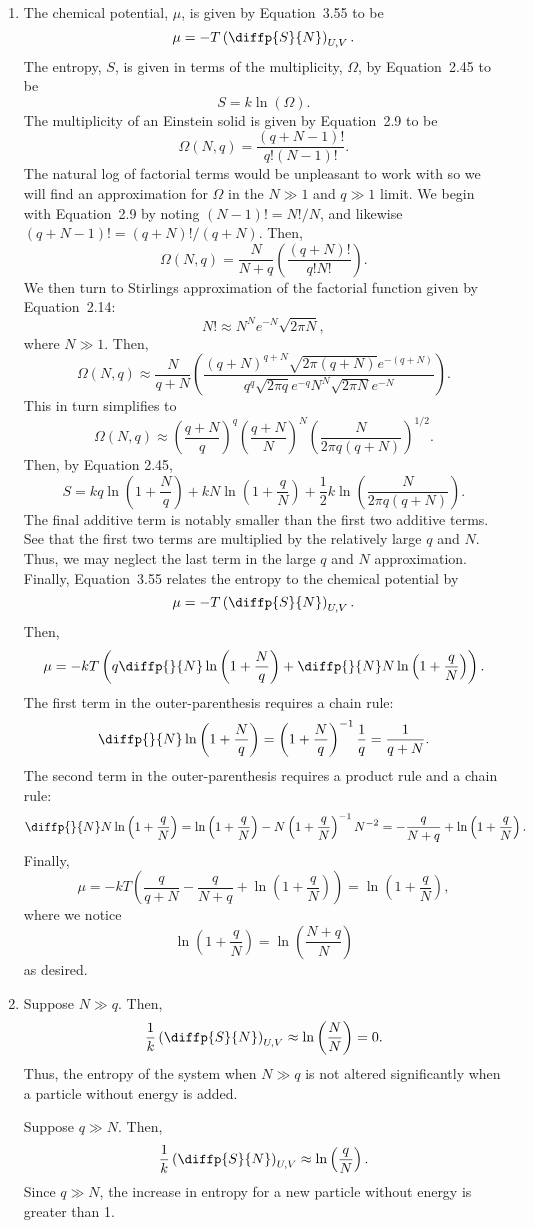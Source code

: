 \documentclass[a4paper, 12pt]{config/homework}
\begin{document}
\begin{enumerate}[label=\textbf{(\alph*)}]
\item The chemical potential, \(\mu\), is given by Equation~3.55 to be
\[\mu = -T\left(\diffp{S}{N}\right)_{U,V}.\]
The entropy, \(S\), is given in terms of the multiplicity, \(\Omega\), by Equation~2.45 to be
\[S = k\ln\left(\Omega\right).\]
The multiplicity of an Einstein solid is given by Equation~2.9 to be
\[\Omega(N,q) = \frac{(q+N-1)!}{q!(N-1)!}.\]
The natural log of factorial terms would be unpleasant to work with so we will find an approximation for \(\Omega\) in the \(N\gg 1\) and \(q\gg 1\) limit. We begin with Equation~2.9 by noting \((N-1)! = N!/N\), and likewise \((q+N-1)!=(q+N)!/(q+N)\). Then,
\[\Omega(N,q) = \frac{N}{N+q}\left(\frac{(q+N)!}{q!N!}\right).\]
We then turn to Stirlings approximation of the factorial function given by Equation~2.14:
\[N! \approx N^N e^{-N}\sqrt{2\pi N},\]
where \(N\gg 1\). Then,
\[\Omega(N,q) \approx \frac{N}{q+N}\left(\frac{(q+N)^{q+N}\sqrt{2\pi (q+N)}e^{-(q+N)}}{q^q \sqrt{2\pi q}e^{-q} N^N \sqrt{2\pi N} e^{-N}}\right).\]
This in turn simplifies to
\[\Omega(N,q) \approx \left(\frac{q+N}{q}\right)^q \left(\frac{q+N}{N}\right)^N \left(\frac{N}{2\pi q \left(q+N\right)}\right)^{1/2}.\]
Then, by Equation 2.45,
\[S = kq\ln\left(1 + \frac{N}{q}\right) + kN\ln\left(1 + \frac{q}{N}\right) + \frac{1}{2}k\ln\left(\frac{N}{2\pi q (q + N)}\right).\]
The final additive term is notably smaller than the first two additive terms. See that the first two terms are multiplied by the relatively large \(q\) and \(N\). Thus, we may neglect the last term in the large \(q\) and \(N\) approximation. Finally, Equation~3.55 relates the entropy to the chemical potential by
\[\mu = -T \left(\diffp{S}{N}\right)_{U,V}.\]
Then,
\[\mu = -kT\left(q \diffp{}{N}\ln\left(1 + \frac{N}{q}\right) + \diffp{}{N}N\ln\left(1 + \frac{q}{N}\right)\right).\]
The first term in the outer-parenthesis requires a chain rule:
\[\diffp{}{N}\ln\left(1 + \frac{N}{q}\right) = \left(1 + \frac{N}{q}\right)^{-1}\frac{1}{q} = \frac{1}{q+N}.\]
The second term in the outer-parenthesis requires a product rule and a chain rule:
\[\diffp{}{N}N\ln\left(1 + \frac{q}{N}\right) = \ln\left(1 + \frac{q}{N}\right) - N\left(1 + \frac{q}{N}\right)^{-1}N^{-2} = -\frac{q}{N+q} + \ln\left(1 + \frac{q}{N}\right).\]
Finally,
\[\mu = -kT\left( \frac{q}{q+N} - \frac{q}{N+q} + \ln\left(1 + \frac{q}{N}\right) \right) = \ln\left( 1 + \frac{q}{N} \right),\]
where we notice
\[\ln\left( 1 + \frac{q}{N} \right) = \ln\left(\frac{N+q}{N}\right)\]
as desired.

\pagebreak
\item Suppose \(N \gg q\). Then,
\[ \frac{1}{k} \left(\diffp{S}{N}\right)_{U,V} \approx \ln\left(\frac{N}{N}\right) = 0.\]
Thus, the entropy of the system when \(N\gg q\) is not altered significantly when a particle without energy is added.

\bigskip\noindent
Suppose \(q \gg N\). Then,
\[\frac{1}{k} \left(\diffp{S}{N}\right)_{U,V} \approx \ln\left(\frac{q}{N}\right).\]
Since \(q\gg N\), the increase in entropy for a new particle without energy is greater than 1.
\end{enumerate}
\end{document}
